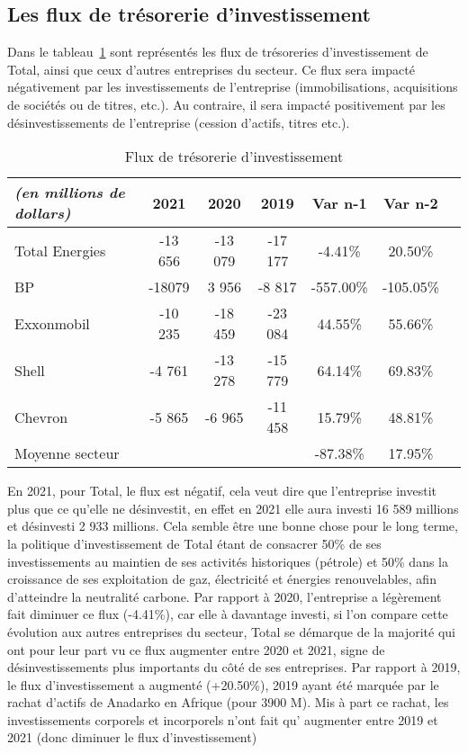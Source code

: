 \documentclass[12pt]{article}
\begin{document}
\subsection{Les flux de trésorerie d'investissement}
Dans le tableau~\ref{table:fluxInvest} sont représentés les flux de trésoreries d'investissement de Total, ainsi que ceux d'autres entreprises du secteur. Ce flux sera impacté négativement par les  investissements de l'entreprise (immobilisations, acquisitions de sociétés ou de titres, etc.). Au contraire, il sera impacté positivement par les désinvestissements de l'entreprise (cession d'actifs, titres etc.).
\begin{table}[H]
    \centering
    \sffamily
    \caption{Flux de trésorerie d'investissement}
    \label{table:fluxInvest}
    \begin{tabular}{l*{1}{cccccc}}
    \toprule
        \textit{(en millions de dollars)} & 2021 & 2020 & 2019 & Var n-1 & Var n-2 \\ 
    \midrule
        Total Energies & -13 656 & -13 079 & -17 177 & -4.41\% & 20.50\% \\
    \midrule
        BP & -18079 & 3 956 & -8 817 & -557.00\% & -105.05\% \\ 
        Exxonmobil & -10 235 & -18 459 & -23 084 & 44.55\% & 55.66\% \\ 
        Shell & -4 761 & -13 278 & -15 779 & 64.14\% & 69.83\% \\ 
        Chevron & -5 865 & -6 965 & -11 458 & 15.79\% & 48.81\% \\
    \midrule 
        Moyenne secteur & ~ & ~ & ~ & -87.38\% & 17.95\% \\
    \bottomrule
    \end{tabular}
\end{table}
En 2021, pour Total, le flux est négatif, cela veut dire que l'entreprise investit plus que ce qu'elle ne désinvestit, en effet en 2021 elle aura investi 16 589 millions et désinvesti 2 933 millions. Cela semble être une bonne chose pour le long terme, la politique d'investissement de Total étant de consacrer 50\% de ses investissements au maintien de ses activités historiques (pétrole) et 50\% dans la croissance de ses exploitation de gaz, électricité et énergies renouvelables, afin d'atteindre la neutralité carbone.
Par rapport à 2020, l'entreprise a légèrement fait diminuer ce flux (-4.41\%), car elle à davantage investi, si l'on compare cette évolution aux autres entreprises du secteur, Total se démarque de la majorité qui ont pour leur part vu ce flux augmenter entre 2020 et 2021, signe de désinvestissements plus importants du côté de ses entreprises.
Par rapport à 2019, le flux d'investissement a augmenté (+20.50\%), 2019 ayant été marquée par le rachat d'actifs de Anadarko en Afrique (pour 3900 M). Mis à part ce rachat, les investissements corporels et incorporels n'ont fait qu' augmenter entre 2019 et 2021 (donc diminuer le flux d'investissement)
\end{document}
